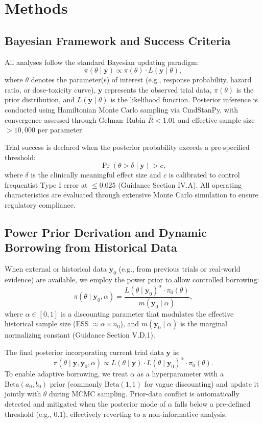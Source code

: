 \documentclass[11pt,a4paper,twoside]{article}
\begin{document}
\section{Methods}

\subsection{Bayesian Framework and Success Criteria}
All analyses follow the standard Bayesian updating paradigm:
\[
\pi(\theta \mid \mathbf{y}) \propto \pi(\theta) \cdot L(\mathbf{y} \mid \theta),
\]
where $\theta$ denotes the parameter(s) of interest (e.g., response probability, hazard ratio, or dose-toxicity curve), $\mathbf{y}$ represents the observed trial data, $\pi(\theta)$ is the prior distribution, and $L(\mathbf{y} \mid \theta)$ is the likelihood function. Posterior inference is conducted using Hamiltonian Monte Carlo sampling via CmdStanPy, with convergence assessed through Gelman–Rubin $\hat{R} < 1.01$ and effective sample size $>10{,}000$ per parameter.

Trial success is declared when the posterior probability exceeds a pre-specified threshold:
\[
\Pr(\theta > \delta \mid \mathbf{y}) > c,
\]
where $\delta$ is the clinically meaningful effect size and $c$ is calibrated to control frequentist Type I error at $\leq 0.025$ (Guidance Section IV.A). All operating characteristics are evaluated through extensive Monte Carlo simulation to ensure regulatory compliance.

\subsection{Power Prior Derivation and Dynamic Borrowing from Historical Data}
When external or historical data $\mathbf{y}_0$ (e.g., from previous trials or real-world evidence) are available, we employ the power prior to allow controlled borrowing:
\[
\pi(\theta \mid \mathbf{y}_0, \alpha) = \frac{L(\theta \mid \mathbf{y}_0)^\alpha \cdot \pi_0(\theta)}{m(\mathbf{y}_0 \mid \alpha)},
\]
where $\alpha \in [0,1]$ is a discounting parameter that modulates the effective historical sample size (ESS $\approx \alpha \times n_0$), and $m(\mathbf{y}_0 \mid \alpha)$ is the marginal normalizing constant (Guidance Section V.D.1).

The final posterior incorporating current trial data $\mathbf{y}$ is:
\[
\pi(\theta \mid \mathbf{y}, \mathbf{y}_0, \alpha) \propto L(\theta \mid \mathbf{y}) \cdot L(\theta \mid \mathbf{y}_0)^\alpha \cdot \pi_0(\theta).
\]
To enable adaptive borrowing, we treat $\alpha$ as a hyperparameter with a $\mathrm{Beta}(a_0, b_0)$ prior (commonly $\mathrm{Beta}(1,1)$ for vague discounting) and update it jointly with $\theta$ during MCMC sampling. Prior-data conflict is automatically detected and mitigated when the posterior mode of $\alpha$ falls below a pre-defined threshold (e.g., 0.1), effectively reverting to a non-informative analysis.
\end{document}
